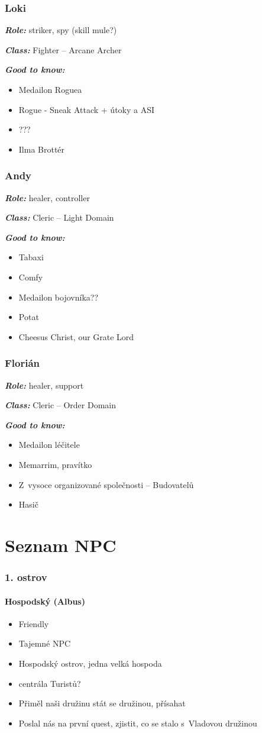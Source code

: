 \documentclass[a4paper,twocolumn,openany,nodeprecatedcode, justified]{dndbook}
\newcommand{\bi}{\begin{itemize}}
\newcommand{\ei}{\end{itemize}}
\newcommand{\titulek}[1]{\par \noindent \textbf{\emph{#1:}}}
\begin{document}
	\section{Loki}
	\titulek{Role} striker, spy (skill mule?)
	\titulek{Class} Fighter -- Arcane Archer
	\titulek{Good to know}
	\bi
	\item Medailon Roguea
	\item Rogue - Sneak Attack + útoky a ASI
	\item ???
	\item Ilma Brottér
	\ei
	
	\section{Andy}
	\titulek{Role} healer, controller
	\titulek{Class} Cleric -- Light Domain
	\titulek{Good to know}
	\bi
		\item Tabaxi
		\item Comfy
		\item Medailon bojovníka??
		\item Potat
		\item Cheesus Christ, our Grate Lord
	\ei
	
	\section{Florián}
	\titulek{Role} healer, support
	\titulek{Class} Cleric -- Order Domain
	\titulek{Good to know}
	\bi
	\item Medailon léčitele
	\item Memarrim, pravítko
	\item Z~vysoce organizované společnosti -- Budovatelů
	\item Hasič
	\ei
	
	
	
	\part{Seznam NPC}
	\section{1. ostrov}
	\subsection[Hospodský]{Hospodský (Albus)}
	\bi
		\item Friendly
		\item Tajemné NPC
		\item Hospodský ostrov, jedna velká hospoda
		\item centrála Turistů?
		\item Přiměl naši družinu stát se družinou, přísahat
		\item Poslal nás na první quest, zjistit, co se stalo s~Vladovou družinou
	\ei
	
\end{document}
